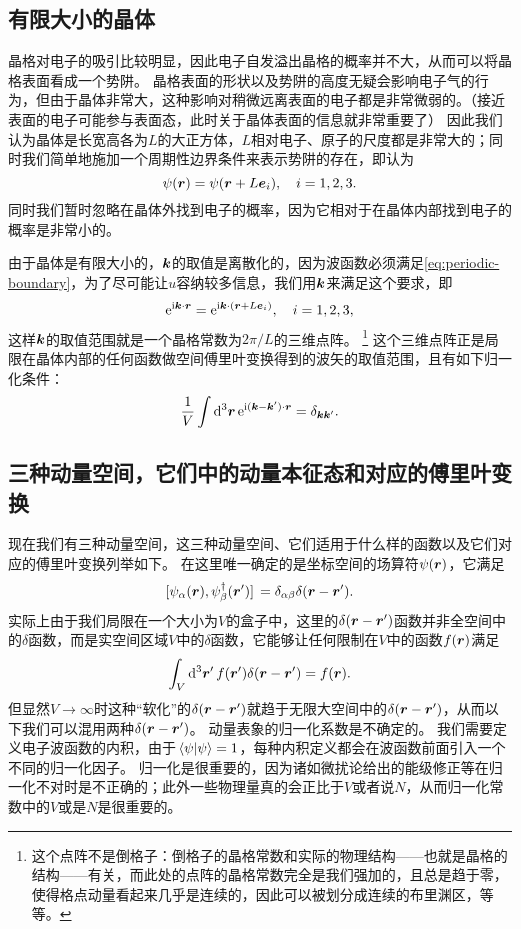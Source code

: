 \subsection{有限大小的晶体}

晶格对电子的吸引比较明显，因此电子自发溢出晶格的概率并不大，从而可以将晶格表面看成一个势阱。
晶格表面的形状以及势阱的高度无疑会影响电子气的行为，但由于晶体非常大，这种影响对稍微远离表面的电子都是非常微弱的。（接近表面的电子可能参与表面态，此时关于晶体表面的信息就非常重要了）
因此我们认为晶体是长宽高各为$L$的大正方体，$L$相对电子、原子的尺度都是非常大的；同时我们简单地施加一个周期性边界条件来表示势阱的存在，即认为
\begin{equation}
    \psi(\vb*{r}) = \psi(\vb*{r} + L \vb*{e}_i), \quad i = 1, 2, 3.
    \label{eq:periodic-boundary}
\end{equation}
同时我们暂时忽略在晶体外找到电子的概率，因为它相对于在晶体内部找到电子的概率是非常小的。

由于晶体是有限大小的，$\vb*{k}$的取值是离散化的，因为波函数必须满足\eqref{eq:periodic-boundary}，为了尽可能让$u$容纳较多信息，我们用$\vb*{k}$来满足这个要求，即
\[
    \mathrm{e}^{\mathrm{i} \vb*{k} \cdot \vb*{r}} = \mathrm{e}^{\mathrm{i} \vb*{k} \cdot (\vb*{r} + L \vb*{e}_i)}, \quad i = 1, 2, 3,
\]
这样$\vb*{k}$的取值范围就是一个晶格常数为$2\pi / L$的三维点阵。%
\footnote{这个点阵不是倒格子：倒格子的晶格常数和实际的物理结构——也就是晶格的结构——有关，而此处的点阵的晶格常数完全是我们强加的，且总是趋于零，使得格点动量看起来几乎是连续的，因此可以被划分成连续的布里渊区，等等。
}%
这个三维点阵正是局限在晶体内部的任何函数做空间傅里叶变换得到的波矢的取值范围，且有如下归一化条件：
\begin{equation}
    \frac{1}{V} \int \dd[3]{\vb*{r}} \mathrm{e}^{\mathrm{i} (\vb*{k} - \vb*{k}') \cdot \vb*{r}} = \delta_{\vb*{k}\vb*{k}'}.
\end{equation}

\subsection{三种动量空间，它们中的动量本征态和对应的傅里叶变换}\label{sec:momentum-space-inner-product}

现在我们有三种动量空间，这三种动量空间、它们适用于什么样的函数以及它们对应的傅里叶变换列举如下。
在这里唯一确定的是坐标空间的场算符$\psi(\vb*{r})$，它满足
\[
    \comm*{\psi_\alpha(\vb*{r})}{\psi^\dagger_\beta(\vb*{r}')} = \delta_{\alpha \beta} \delta(\vb*{r} - \vb*{r}').
\]
实际上由于我们局限在一个大小为$V$的盒子中，这里的$\delta(\vb*{r} - \vb*{r}')$函数并非全空间中的$\delta$函数，而是实空间区域$V$中的$\delta$函数，它能够让任何限制在$V$中的函数$f(\vb*{r})$满足
\[
    \int_V \dd[3]{\vb*{r}'} f(\vb*{r}') \delta(\vb*{r} - \vb*{r}') = f(\vb*{r}).
\]
但显然$V \to \infty$时这种“软化”的$\delta(\vb*{r} - \vb*{r}')$就趋于无限大空间中的$\delta(\vb*{r} - \vb*{r}')$，从而以下我们可以混用两种$\delta(\vb*{r} - \vb*{r}')$。
动量表象的归一化系数是不确定的。
我们需要定义电子波函数的内积，由于$\braket*{\psi}{\psi} = 1$，每种内积定义都会在波函数前面引入一个不同的归一化因子。
归一化是很重要的，因为诸如微扰论给出的能级修正等在归一化不对时是不正确的；此外一些物理量真的会正比于$V$或者说$N$，从而归一化常数中的$V$或是$N$是很重要的。

